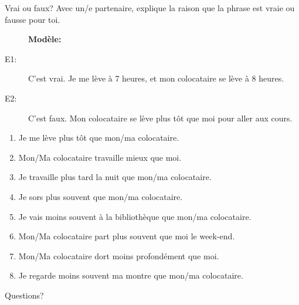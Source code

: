 \documentclass{beamer}
\begin{document}
  \begin{frame}{Vrai ou faux?}
    Avec un/e partenaire, explique la raison que la phrase est vraie ou fausse pour toi. \\
    {\scriptsize
    \begin{description}
      \item[] \textbf{Modèle:} 
      \item[E1:] C'est vrai. Je me lève à 7 heures, et mon colocataire se lève à 8 heures.
      \item[E2:] C'est faux. Mon colocataire se lève plus tôt que moi pour aller aux cours.
    \end{description}
    \begin{enumerate}
      \item Je me lève plus tôt que mon/ma colocataire.
      \item Mon/Ma colocataire travaille mieux que moi.
      \item Je travaille plus tard la nuit que mon/ma colocataire.
      \item Je sors plus souvent que mon/ma colocataire.
      \item Je vais moins souvent à la bibliothèque que mon/ma colocataire.
      \item Mon/Ma colocataire part plus souvent que moi le week-end.
      \item Mon/Ma colocataire dort moins profondément que moi.
      \item Je regarde moins souvent ma montre que mon/ma colocataire.
    \end{enumerate}
    }
  \end{frame}

  \begin{frame}{}
    \begin{center}
      \Large Questions?
    \end{center}
  \end{frame}
\end{document}
